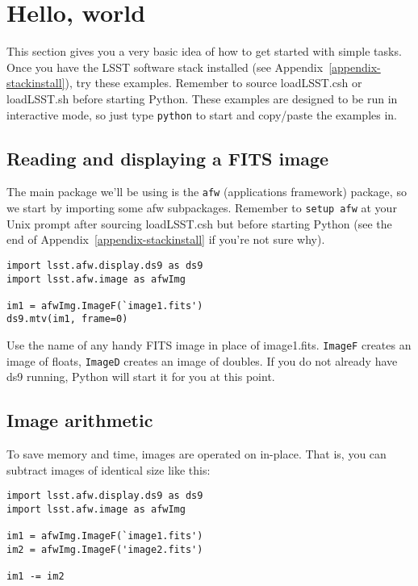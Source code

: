 \documentclass{book}
\def\t{\texttt}
\begin{document}
\chapter{Hello, world\label{chap-hello}}

This section gives you a very basic idea of how to get started with
simple tasks.  Once you have the LSST software stack installed (see
Appendix~\ref{appendix-stackinstall}), try these examples.  Remember
to source loadLSST.csh or loadLSST.sh before starting Python.  These
examples are designed to be run in interactive mode, so just type
\texttt{python} to start and copy/paste the examples in.


\section{Reading and displaying a FITS image}

The main package we'll be using is the \texttt{afw} (applications
framework) package, so we start by importing some afw subpackages.
Remember to \t{setup afw} at your Unix prompt after sourcing
loadLSST.csh but before starting Python (see the end of
Appendix~\ref{appendix-stackinstall} if you're not sure why).

\begin{verbatim}
import lsst.afw.display.ds9 as ds9
import lsst.afw.image as afwImg

im1 = afwImg.ImageF(`image1.fits')
ds9.mtv(im1, frame=0)
\end{verbatim}

Use the name of any handy FITS image in place of image1.fits.
\texttt{ImageF} creates an image of floats, \texttt{ImageD} creates an
image of doubles.  If you do not already have ds9 running, Python will
start it for you at this point.

\section{Image arithmetic}

To save memory and time, images are operated on in-place.  That is,
you can subtract images of identical size like this:

\begin{verbatim}
import lsst.afw.display.ds9 as ds9
import lsst.afw.image as afwImg

im1 = afwImg.ImageF(`image1.fits')
im2 = afwImg.ImageF('image2.fits')

im1 -= im2
\end{verbatim}
\end{document}
